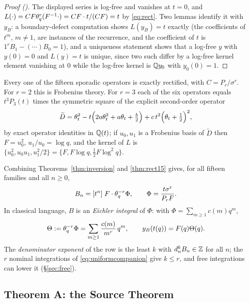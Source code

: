\begin{proof}[Proof {\rm(\cite[\S2]{ProjAnchors})}]
The displayed series is log-free and vanishes at $t=0$, and
$L(\cdot)=CF\theta_q^r(F^{-1}\cdot)=CF\cdot t/(CF)=t$ by \eqref{eq:rect}.  Two
lemmas identify it with $y_B$: a boundary-defect computation shows
$L(y_B)=t$ exactly (the coefficients of $t^m$, $m\neq1$, are instances of the
recurrence, and the coefficient of $t$ is $1^rB_1-(\cdots)B_0=1$), and a
uniqueness statement shows that a log-free $y$ with $y(0)=0$ and $L(y)=t$ is
unique, since two such differ by a log-free kernel element vanishing at $0$
while the log-free kernel is $\mathbb{Q} y_0$ with $y_0(0)=1$.
\end{proof}

\begin{theorem}
\label{thm:rect15}
\Proved{} Every one of the fifteen sporadic operators is exactly rectified,
with $C=P_r/\sigma^r$.  For $r=2$ this is Frobenius theory.  For $r=3$ each of
the six operators equals $t^3P_3(t)$ times the symmetric square of the explicit
second-order operator
\[
\widetilde D=\theta_t^2-t\Bigl(2a\theta_t^2+a\theta_t+\tfrac b2\Bigr)
+c\,t^2\Bigl(\theta_t+\tfrac12\Bigr)^2 ,
\]
by exact operator identities in $\mathbb{Q}(t)$; if $u_0,u_1$ is a Frobenius basis of
$\widetilde D$ then $F=u_0^2$, $u_1/u_0=\log q$, and the kernel of $L$ is
$\{u_0^2,u_0u_1,u_1^2/2\}=\{F,F\log q,\tfrac12F\log^2q\}$.
\end{theorem}

Combining Theorems~\ref{thm:inversion} and \ref{thm:rect15} gives, for all
fifteen families and all $n\ge0$,
\begin{equation}\label{eq:uniformcompanion}
B_n=[t^n]\;F\cdot\theta_q^{-r}\Phi,\qquad \Phi=\frac{t\sigma^r}{P_rF}.
\end{equation}
In classical language, $B$ is an \emph{Eichler integral} of $\Phi$: with
$\Phi=\sum_{m\ge1}c(m)q^m$,
\begin{equation}\label{eq:Theta}
\Theta:=\theta_q^{-r}\Phi=\sum_{m\ge1}\frac{c(m)}{m^{r}}\,q^m,
\qquad y_B(t(q))=F(q)\Theta(q).
\end{equation}
The \emph{denominator exponent} of the row is the least $k$ with
$d_n^kB_n\in\mathbb{Z}$ for all $n$; the $r$ nominal integrations of
\eqref{eq:uniformcompanion} give $k\le r$, and free integrations can lower it
(\S\ref{sec:free}).

\subsection{Theorem A: the Source Theorem}\label{sec:thmA}

